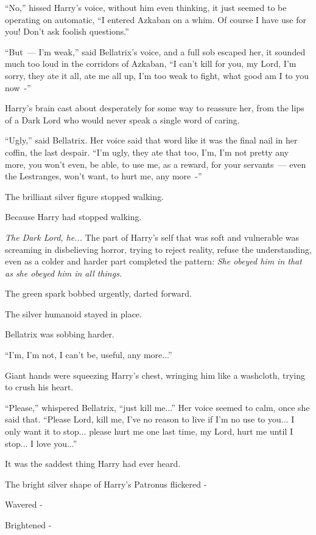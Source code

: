 ``No,'' hissed Harry's voice, without him even thinking, it just seemed to be operating on automatic, ``I entered Azkaban on a whim. Of course I have use for you! Don't ask foolish questions.''

``But~--- I'm weak,'' said Bellatrix's voice, and a full sob escaped her, it sounded much too loud in the corridors of Azkaban, ``I can't kill for you, my Lord, I'm sorry, they ate it all, ate me all up, I'm too weak to fight, what good am I to you now~-''

Harry's brain cast about desperately for some way to reassure her, from the lips of a Dark Lord who would never speak a single word of caring.

``Ugly,'' said Bellatrix. Her voice said that word like it was the final nail in her coffin, the last despair. ``I'm ugly, they ate that too, I'm, I'm not pretty any more, you won't even, be able, to use me, as a reward, for your servants~--- even the Lestranges, won't want, to hurt me, any more~-''

The brilliant silver figure stopped walking.

Because Harry had stopped walking.

\emph{The Dark Lord, he...} The part of Harry's self that was soft and vulnerable was screaming in disbelieving horror, trying to reject reality, refuse the understanding, even as a colder and harder part completed the pattern: \emph{She obeyed him in that as she obeyed him in all things.}

The green spark bobbed urgently, darted forward.

The silver humanoid stayed in place.

Bellatrix was sobbing harder.

``I'm, I'm not, I can't be, useful, any more...''

Giant hands were squeezing Harry's chest, wringing him like a washcloth, trying to crush his heart.

``Please,'' whispered Bellatrix, ``just kill me...'' Her voice seemed to calm, once she said that. ``Please Lord, kill me, I've no reason to live if I'm no use to you... I only want it to stop... please hurt me one last time, my Lord, hurt me until I stop... I love you...''

It was the saddest thing Harry had ever heard.

The bright silver shape of Harry's Patronus flickered -

Wavered -

Brightened -

